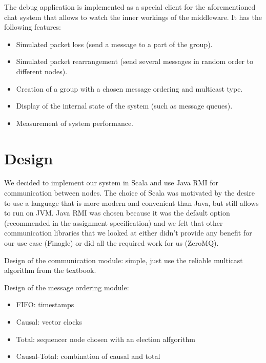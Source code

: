 \documentclass[10pt, oneside]{article}
\begin{document}
The debug application is implemented as a special client for the aforementioned
chat system that allows to watch the inner workings of the middleware. It has
the following features:
\begin{itemize}
\item Simulated packet loss (send a message to a part of the group).
\item Simulated packet rearrangement (send several messages in random order to
  different nodes).
\item Creation of a group with a chosen message ordering and multicast type.
\item Display of the internal state of the system (such as message queues).
\item Measurement of system performance.
\end{itemize}

\section{Design}

We decided to implement our system in Scala and use Java RMI for communication
between nodes. The choice of Scala was motivated by the desire to use a language
that is more modern and convenient than Java, but still allows to run on
JVM. Java RMI was chosen because it was the default option (recommended in the
assignment specification) and we felt that other communication libraries that we
looked at either didn't provide any benefit for our use case (Finagle) or did
all the required work for us (ZeroMQ).

Design of the communication module: simple, just use the reliable multicast
algorithm from the textbook.

Design of the message ordering module:
\begin{itemize}
\item FIFO: timestamps
\item Causal: vector clocks
\item Total: sequencer node chosen with an election alfgorithm
\item Causal-Total: combination of causal and total
\end{itemize}
\end{document}
